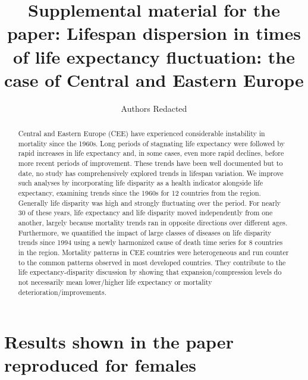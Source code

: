 \documentclass{article}
\title{Supplemental material for the paper: Lifespan dispersion in times of life expectancy fluctuation: the case of Central and Eastern Europe}
\author[]{Authors Redacted}
\date{}
\begin{document}
\maketitle

\begin{abstract}
Central and Eastern Europe (CEE) have experienced considerable instability in mortality since the 1960s. Long periods of stagnating life expectancy were followed by rapid increases in life expectancy and, in some cases, even more rapid declines, before more recent periods of improvement. These trends have been well documented but to date, no study has comprehensively explored trends in lifespan variation.  We improve such analyses by incorporating life disparity as a health indicator alongside life expectancy, examining trends since the 1960s for 12 countries from the region. Generally life disparity was high and strongly fluctuating over the period. For nearly 30 of these years, life expectancy and life disparity moved independently from one another, largely because mortality trends ran in opposite directions over different ages. Furthermore, we quantified the impact of large classes of diseases on life disparity trends since 1994 using a newly harmonized cause of death time series for 8 countries in the region. Mortality patterns in CEE countries were heterogeneous and run counter to the common patterns observed in most developed countries. They contribute to the life expectancy-disparity discussion by showing that expansion/compression levels do not necessarily mean lower/higher life expectancy or mortality deterioration/improvements.
\end{abstract}


\newpage


\section*{Results shown in the paper reproduced for females}
\end{document}
